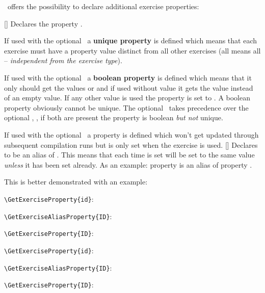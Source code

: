 \documentclass{xsim-manual}
\begin{document}
\xsim\ offers the possibility to declare additional exercise properties:
\begin{commands}
  [\barg\sarg\narg{}]
    Declares the property .
    
    If used with the optional \barg\ a \textbf{unique property} is defined
    which means that each exercise must have a property value distinct from
    all other exercises (all means all -- \emph{independent from the exercise
      type}).

    If used with the optional \sarg\ a \textbf{boolean property} is defined
    which means that it only should get the values  or 
    and if used without value it gets the value  instead of an
    empty value.  If any other value is used the property is set to
    .  A boolean property obviously cannot be unique.  The
    optional \sarg\ takes precedence over the optional \barg, \ie, if both are
    present the property is boolean \emph{but not} unique.

    If used with the optional \narg\ a property is defined which won't get
    updated through subsequent compilation runs but is only set when the
    exercise is used.
  []
    Declares  to be an alias of .  This
    means that each time  is set  will be
    set to the same value \emph{unless} it has been set already.  As an
    example: property  is an alias of property .
\end{commands}

This is better demonstrated with an example:
\begin{example}
  \begin{exercise}
    \verb+\GetExerciseProperty{id}+:  \par
    \verb+\GetExerciseAliasProperty{ID}+:  \par
    \verb+\GetExerciseProperty{ID}+: 
  \end{exercise}
  \begin{exercise}[ID=foo-bar]
    \verb+\GetExerciseProperty{id}+:  \par
    \verb+\GetExerciseAliasProperty{ID}+:  \par
    \verb+\GetExerciseProperty{ID}+: 
  \end{exercise}
\end{example}
\end{document}
